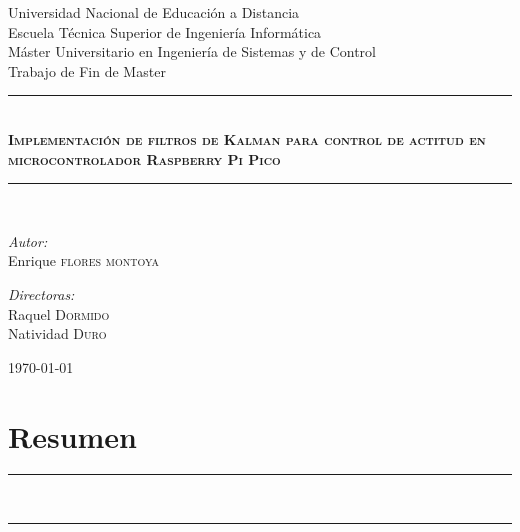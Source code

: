 \documentclass[a4paper,12pt]{book}
\begin{document}
\begin{titlepage}
\begin{figure}
\end{figure}


\begin{center}
{\large Universidad Nacional de Educación a Distancia}\\[0.5cm]
{\large Escuela Técnica Superior de Ingeniería Informática}\\[0.5cm]
{\large Máster Universitario en Ingeniería de Sistemas y de Control}\\[0.5cm]
{\large Trabajo de Fin de Master}\\[0.5cm]

\rule{\linewidth}{0.5mm} \\[0.4cm]
{ \huge \bfseries \textsc{Implementación de filtros de Kalman para control de actitud en microcontrolador Raspberry Pi Pico} \\[0.4cm] }
\rule{\linewidth}{0.5mm} \\[1.5cm]

\noindent
\begin{minipage}{0.4\textwidth}
  \begin{flushleft} \large
    \emph{Autor:}\\
Enrique \textsc{flores montoya}\\
  \end{flushleft}
\end{minipage}%
\begin{minipage}{0.4\textwidth}
  \begin{flushright} \large
    \emph{Directoras:} \\
    Raquel \textsc{Dormido}\\
    Natividad \textsc{Duro}
  \end{flushright}
\end{minipage}

\vfill

{\today}

\end{center}
\end{titlepage}
\frontmatter

\chapter*{Resumen}

\noindent\rule[2pt]{\textwidth}{0.5pt}\\



\noindent\rule[2pt]{\textwidth}{0.5pt}\\
\clearpage
\end{document}
